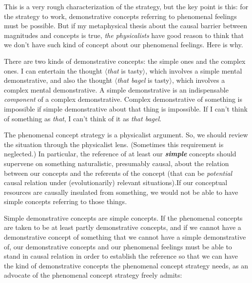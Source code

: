 \documentclass[a4paper,12pt]{article}
\begin{document}
This is a very rough characterization of the strategy, but the key point is this: for the strategy to work, demonstrative concepts referring to phenomenal feelings must be possible. But if my metaphysical thesis about the causal barrier between magnitudes and concepts is true, \emph{the physicalists} have good reason to think that we don't have such kind of concept about our phenomenal feelings. Here is why.

There are two kinds of demonstrative concepts: the simple ones and the complex ones. I can entertain the thought $\langle$\emph{that} is tasty$\rangle$, which involves a simple mental demonstrative, and also the thought $\langle$\emph{that bagel} is tasty$\rangle$, which involves a complex mental demonstrative. A simple demonstrative is an indispensable \emph{component} of a complex demonstrative. Complex demonstrative of something is impossible if simple demonstrative about that thing is impossible. If I can't think of something as \emph{that}, I can't think of it as \emph{that bagel}.

The phenomenal concept strategy is a physicalist argument. So, we should review the situation through the physicalist lens. (Sometimes this requirement is neglected.) In particular, the reference of at least our \textbf{\emph{simple}} concepts should supervene on something naturalistic, presumably causal, about the relation between our concepts and the referents of the concept (that can be \emph{potential} causal relation under (evolutionarily) relevant situations).\footnotemark If our conceptual resources are causally insulated from something, we would not be able to have simple concepts referring to those things.


Simple demonstrative concepts are simple concepts. If the phenomenal concepts are taken to be at least partly demonstrative concepts, and if we cannot have a demonstrative concept of something that we cannot have a simple demonstrative of, our demonstrative concepts and our phenomenal feelings must be able to stand in causal relation in order to establish the reference so that we can have the kind of demonstrative concepts the phenomenal concept strategy needs, as an advocate of the phenomenal concept strategy freely admits:
\end{document}

